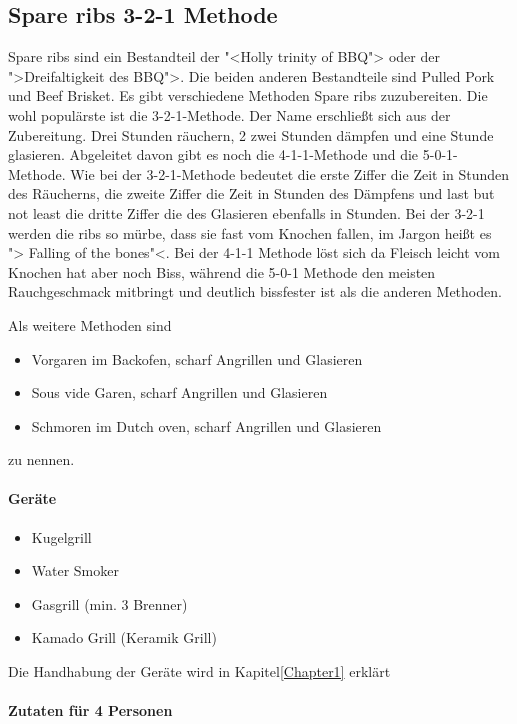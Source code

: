 \subsection{Spare ribs 3-2-1 Methode}
Spare ribs sind ein Bestandteil der "<Holly trinity of BBQ">  oder der 
">Dreifaltigkeit des BBQ">. Die beiden anderen Bestandteile sind Pulled 
Pork und Beef Brisket. 
Es gibt verschiedene Methoden Spare ribs zuzubereiten. Die wohl 
populärste ist die 3-2-1-Methode. Der Name erschließt sich aus der 
Zubereitung. Drei Stunden räuchern, 2 zwei Stunden dämpfen und eine 
Stunde glasieren. Abgeleitet davon gibt es noch die  4-1-1-Methode und 
die 5-0-1-Methode. Wie bei der 3-2-1-Methode bedeutet die erste Ziffer 
die Zeit in Stunden des Räucherns, die zweite Ziffer die Zeit in Stunden 
des Dämpfens und last but not least die dritte Ziffer die des Glasieren 
ebenfalls in Stunden.  
Bei der 3-2-1 werden die ribs so mürbe, dass sie fast vom Knochen fallen, 
im Jargon heißt es "> Falling of the bones"<. Bei der 4-1-1 Methode löst 
sich da Fleisch leicht vom Knochen hat aber noch Biss, während die 5-0-1 
Methode den meisten Rauchgeschmack mitbringt und deutlich bissfester 
ist als die anderen Methoden.

Als weitere Methoden sind

\begin{itemize}[noitemsep]
	\item Vorgaren im Backofen, scharf Angrillen und Glasieren
	\item Sous vide Garen, scharf Angrillen und Glasieren
	\item Schmoren im Dutch oven, scharf Angrillen und Glasieren
\end{itemize}
zu nennen.
\newline

\paragraph{Geräte}

\begin{itemize}[noitemsep]
	\item Kugelgrill
	\item Water Smoker
 	\item Gasgrill (min. 3 Brenner)
	\item Kamado Grill (Keramik Grill)
\end{itemize}

Die Handhabung der Geräte wird in Kapitel\ref{Chapter1} erklärt

\paragraph{Zutaten für 4 Personen}

